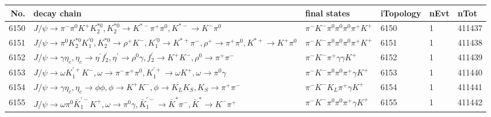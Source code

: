 \begin{table}[htbp] 
\begin{center}
\begin{small}
\begin{tabular}{rlllll}\hline\hline
 No. & decay chain & final states &  iTopology & nEvt & nTot \\\hline
6150&$J/\psi       \rightarrow \pi^{-}        \pi^{0}        K^{+}          K_2^{*0}       , K_2^{*0}        \rightarrow K^{*-}         \pi^{+}        \pi^{0}        , K^{*-}          \rightarrow K^{-}          \pi^{0}        $&$\pi^{-}        K^{-}          \pi^{0}        \pi^{0}        \pi^{0}        \pi^{+}        K^{+}          $& 6150&    1&411437\\
6151&$J/\psi       \rightarrow \pi^{0}        K_2^{*0}       K_1^{'0}      , K_2^{*0}        \rightarrow \rho^{+}      K^{-}          , K_1^{'0}       \rightarrow K^{*+}         \pi^{-}        , \rho^{+}       \rightarrow \pi^{+}        \pi^{0}        , K^{*+}          \rightarrow K^{+}          \pi^{0}        $&$\pi^{-}        K^{-}          \pi^{0}        \pi^{0}        \pi^{0}        \pi^{+}        K^{+}          $& 6151&    1&411438\\
6152&$J/\psi       \rightarrow \gamma       \eta_{c}    , \eta_{c}     \rightarrow \eta^{\prime} f_2^{'}       , \eta^{\prime}  \rightarrow \rho^{0}      \gamma       , f_2^{'}        \rightarrow K^{+}          K^{-}          , \rho^{0}       \rightarrow \pi^{+}        \pi^{-}        $&$\pi^{-}        K^{-}          \pi^{+}        \gamma       \gamma       K^{+}          $& 6152&    1&411439\\
6153&$J/\psi       \rightarrow \omega         K_1^{'+}      K^{-}          , \omega          \rightarrow \pi^{-}        \pi^{+}        \pi^{0}        , K_1^{'+}       \rightarrow \omega         K^{+}          , \omega          \rightarrow \pi^{0}        \gamma       $&$\pi^{-}        K^{-}          \pi^{0}        \pi^{0}        \pi^{+}        \gamma       K^{+}          $& 6153&    1&411440\\
6154&$J/\psi       \rightarrow \gamma       \eta_{c}    , \eta_{c}     \rightarrow \phi           \phi           , \phi            \rightarrow K^{+}          K^{-}          , \phi            \rightarrow K_{L}          K_{S}          , K_{S}           \rightarrow \pi^{+}        \pi^{-}        $&$\pi^{-}        K^{-}          K_{L}          \pi^{+}        \gamma       K^{+}          $& 6154&    1&411441\\
6155&$J/\psi       \rightarrow \omega         \pi^{0}        \bar{K}_1^{'-}K^{+}          , \omega          \rightarrow \pi^{0}        \gamma       , \bar{K}_1^{'-} \rightarrow \bar{K}^{*}   \pi^{-}        , \bar{K}^{*}    \rightarrow K^{-}          \pi^{+}        $&$\pi^{-}        K^{-}          \pi^{0}        \pi^{0}        \pi^{+}        \gamma       K^{+}          $& 6155&    1&411442\\

\end{tabular}
\end{small}
\end{center}
\end{table}
